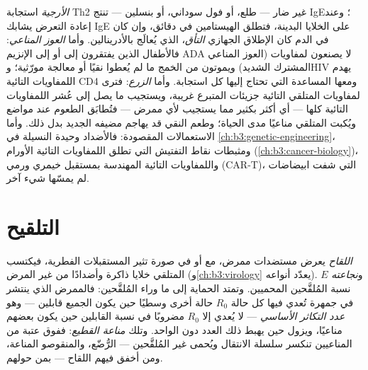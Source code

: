 \begin{example}\label{ex:b3:adaptive-immunity:failures}
\emph{الأرجية} استجابة Th2  غير ضار --- طلع، أو فول
سوداني، أو بنسلين --- تنتج IgE؛ وعند إعادة التعرض يشابك
 IgE على الخلايا البدينة، فتطلق الهيستامين في دقائق،
وإن كان  في الدم كان الإطلاق الجهازي \emph{التأق}،
الذي يُعالَج بالأدرينالين. وأما \emph{العوز المناعي}:
فالأطفال الذين يفتقرون إلى  أو إلى الإنزيم ADA لا يصنعون
لمفاويات (العوز المناعي المشترك الشديد) ويموتون من الخمج ما
لم يُعطوا نقيًا أو معالجة مورّثية؛ وHIV يهدم اللمفاويات
التائية CD4 ومعها المساعدة التي تحتاج إليها كل استجابة.
وأما \emph{الزرع}: فترى لمفاويات المتلقي التائية جزيئات 
المتبرع غريبة، ويستجيب ما يصل إلى عُشر اللمفاويات التائية
كلها --- أي أكثر بكثير مما يستجيب لأي ممرض --- فتُطابَق
الطعوم عند مواضع  ويُكبت المتلقي مناعيًا مدى الحياة؛
وطعم النقي قد يهاجم مضيفه الجديد بدل ذلك. وأما الاستعمالات
المقصودة: فالأضداد وحيدة النسيلة في
\cref{ch:b3:genetic-engineering}، ومثبطات نقاط التفتيش التي
تطلق اللمفاويات التائية  الأورام
(\cref{ch:b3:cancer-biology})، واللمفاويات التائية المهندسة
بمستقبل خيمري  ورمي (CAR-T)، التي شفت ابيضاضات لم
يمسّها شيء آخر.
\end{example}

\section{التلقيح}

\begin{definition}\label{def:b3:adaptive-immunity:vaccine}
\emph{اللقاح} يعرض مستضدات ممرض، مع  أو في صورة
تثير المستقبلات الفطرية، فيكتسب المتلقي خلايا ذاكرة
وأضدادًا من غير المرض (و\cref{ch:b3:virology} يعدّد أنواعه).
و\emph{نجاعته} $E$ نسبة المُلقَّحين المحميين. وتمتد الحماية
إلى ما وراء المُلقَّحين: فالممرض الذي ينتشر في جمهرة تُعدي
فيها كل حالة $R_{0}$ حالة أخرى وسطيًا حين يكون الجميع
قابلين --- وهو \emph{عدد التكاثر الأساسي} --- لا يُعدي إلا
$R_{0}$ مضروبًا في نسبة القابلين حين يكون بعضهم مناعيًا،
ويزول حين يهبط ذلك العدد دون الواحد. وتلك \emph{مناعة
القطيع}: ففوق عتبة من المناعيين تنكسر سلسلة الانتقال ويُحمى
غير المُلقَّحين --- الرُّضّع، والمنقوصو المناعة، ومن أخفق
فيهم اللقاح --- بمن حولهم.
\end{definition}

